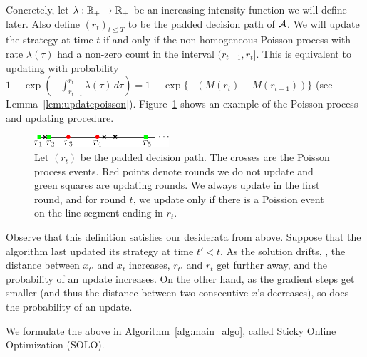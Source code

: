 Concretely, let $\lambda: \mathbb{R}_+ \to \mathbb{R}_+$ be an increasing intensity function we will define later. Also define $(r_t)_{t\leq T}$ to be the padded decision path of $\mathcal{A}$. We will update the strategy at time $t$ if and only if the non-homogeneous Poisson process with rate $\lambda(\tau)$ had a non-zero count in the interval $(r_{t-1}, r_t].$ This is equivalent to updating with probability  $1 - \exp(-\int_{r_{t-1}}^{r_t} \lambda(\tau)\, d\tau)  = 1 - \exp\{-(M(r_t)- M(r_{t-1}))\}$ (see Lemma~\ref{lem:updatepoisson}). Figure~\ref{fig:poisson} shows an example of the Poisson process and updating procedure.

\begin{figure}[h!]
    \centering
    \includegraphics[width=5cm]{figures/poisson}
    \caption{Let $(r_t)$ be the padded decision path. The crosses are the Poisson process events. Red points denote rounds we do not update and green squares are updating rounds. We always update in the first round, and for round $t$, we update only if there is a Poission event on the line segment ending in $r_t$.}
    \label{fig:poisson}
\end{figure}

Observe that this definition satisfies our desiderata from above. Suppose that the algorithm last updated its strategy at time $t' < t$. As the solution drifts, \ie, the distance between $x_{t'}$ and $x_t$ increases, $r_{t'}$ and $r_t$ get further away, and the probability of an update increases. On the other hand, as the gradient steps get smaller (and thus the distance between two consecutive $x$'s decreases), so does the probability of an update. 

We formulate the above in Algorithm~\ref{alg:main_algo}, called Sticky Online Optimization (SOLO). 

